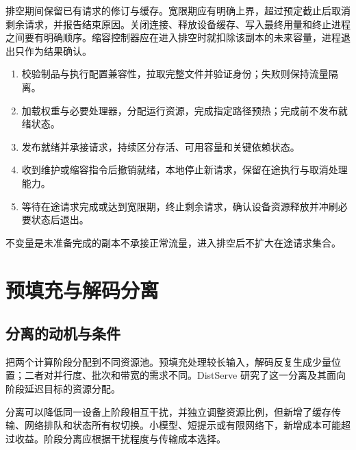 \documentclass[../textbook.tex]{subfiles}
\begin{document}
排空期间保留已有请求的修订与缓存。宽限期应有明确上界，超过预定截止后取消剩余请求，并报告结束原因。关闭连接、释放设备缓存、写入最终用量和终止进程之间要有明确顺序。缩容控制器应在进入排空时就扣除该副本的未来容量，进程退出只作为结果确认。

\begin{algorithm}[工作进程的上线与下线]
\begin{enumerate}
\item 校验制品与执行配置兼容性，拉取完整文件并验证身份；失败则保持流量隔离。
\item 加载权重与必要处理器，分配运行资源，完成指定路径预热；完成前不发布就绪状态。
\item 发布就绪并承接请求，持续区分存活、可用容量和关键依赖状态。
\item 收到维护或缩容指令后撤销就绪，本地停止新请求，保留在途执行与取消处理能力。
\item 等待在途请求完成或达到宽限期，终止剩余请求，确认设备资源释放并冲刷必要状态后退出。
\end{enumerate}
不变量是未准备完成的副本不承接正常流量，进入排空后不扩大在途请求集合。
\end{algorithm}

\section{预填充与解码分离}
\optional
\subsection{分离的动机与条件}
把两个计算阶段分配到不同资源池。预填充处理较长输入，解码反复生成少量位置；二者对并行度、批次和带宽的需求不同。DistServe 研究了这一分离及其面向阶段延迟目标的资源分配\cite{zhong2024distserve}。

分离可以降低同一设备上阶段相互干扰，并独立调整资源比例，但新增了缓存传输、网络排队和状态所有权切换。小模型、短提示或有限网络下，新增成本可能超过收益。阶段分离应根据干扰程度与传输成本选择。
\end{document}
